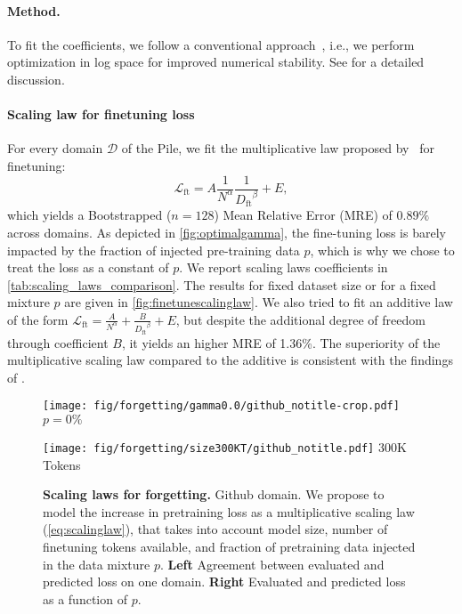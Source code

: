 \paragraph{Method.} To fit the coefficients, we follow a conventional approach~\citep{muennighoff2023scaling}, i.e., we perform optimization in log space for improved numerical stability. See  for a detailed discussion.

\paragraph{Scaling law for finetuning loss} For every domain $\mathcal{D}$ of the Pile, we fit the multiplicative law proposed by~\citet{zhang2024when} for finetuning:
\begin{equation}
\label{eq:finetuningscalinglaw}
\mathcal{L}_{\mathrm{ft}} 
    = A\frac{1}{{N}^{\alpha}} 
    \frac{1}{{D_{\mathrm{ft}}}^{\beta}} + {E},    
\end{equation}
which yields a Bootstrapped ($n=128$) Mean Relative Error (MRE) of $\bm{0.89\%}$ across domains.
As depicted in \autoref{fig:optimalgamma}, the fine-tuning loss is barely impacted by the fraction of injected pre-training data $p$, which is why we chose to treat the loss as a constant of $p$.
We report scaling laws coefficients in \autoref{tab:scaling_laws_comparison}.
The results for fixed dataset size or for a fixed mixture $p$ are given in \autoref{fig:finetunescalinglaw}.
We also tried to fit an additive law of the form $\mathcal{L}_{\mathrm{ft}} 
= \frac{A}{{N}^{\alpha}}  + 
\frac{B}{{D_{\mathrm{ft}}}^{\beta}} +{E}$, but despite the additional degree of freedom through coefficient $B$, it yields an higher MRE of 1.36\%. The superiority of the multiplicative scaling law compared to the additive is consistent with the findings of \citet{zhang2024when}.



\begin{figure*}[t]
    \centering
    \begin{minipage}{0.49\textwidth}
        \centering
        \texttt{[image: fig/forgetting/gamma0.0/github\_notitle-crop.pdf]}
        $p = 0\%$
        \label{fig:wikipedia_gamma_forget}
    \end{minipage} 
    \begin{minipage}{0.49\textwidth}
        \centering
        \texttt{[image: fig/forgetting/size300KT/github\_notitle.pdf]}
        300K Tokens
        \label{fig:dm_mathematics_size_forget}
    \end{minipage}
    \caption{\textbf{Scaling laws for forgetting.} Github domain. We propose to model the increase in pretraining loss as a multiplicative scaling law (\autoref{eq:scalinglaw}), that takes into account model size, number of finetuning tokens available, and fraction of pretraining data injected in the data mixture $p$. \textbf{Left} Agreement between evaluated and predicted loss on one domain. \textbf{Right} Evaluated and predicted loss as a function of $p$.}
\label{fig:forgettingscalinglaw}
\end{figure*}


